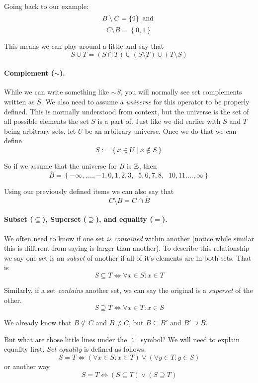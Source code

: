 Going back to our example:
\[
B \setminus C = \left\{9\right\}\textnormal{ and }
\] \[
C \setminus B = \left\{0,1\right\}
\]

This means we can play around a little and say that 
\[
S \cup T = \left(S \cap T\right) \cup \left(S \setminus T\right) \cup  \left(T \setminus S\right) 
\]

\paragraph{Complement ($\sim$).}
While we can write something like $\sim S$, you will normally see set complements written as $\overline{S}$. 
We also need to assume a \emph{universe} for this operator to be properly defined. 
This is normally understood from context, but the universe is the set of all possible elements the set $S$ is a part of. 
Just like we did earlier with $S$ and $T$ being arbitrary sets, let $U$ be an arbitrary universe.
Once we do that we can define 
\[
\overline{S} := \left\{x \in U \mid x \notin S\right\}
\]

So if we assume that the universe for $B$ is $\operatorname{\mathbb{Z}}$,
then 
\[
\overline{B} = \left\{-\infty,....,-1,0,1,2,3,\;\;5,6,7,8,\;\;10,11....,\infty\right\} 
\]

Using our previously defined items we can also say that 
\[
C \setminus B = C \cap \overline{B}
\]

\paragraph{Subset ($\subseteq$), Superset ($\supseteq$), and equality ($=$).}
We often need to know if one set \textit{is contained} within another (notice while similar this is different from saying is larger than another). 
To describe this relationship we say one set is an \emph{subset} of another if all of it's elements are in both sets. 
That is
\[
S \subseteq T \iff \forall x \in S : x \in T
\]

Similarly, if a set \textit{contains} another set, we can say the original is a \emph{superset} of the other. 
\[
S \supseteq T \iff \forall x \in T: x \in S
\] 

We already know that $B \nsubseteq C$ and $B \nsupseteq C$, but $B \subseteq B'$ and $B' \supseteq B$. 

But what are those little lines under the $\subseteq$ symbol? We will need to explain equality first. 
\emph{Set equality} is defined as follows:
\[
S = T \iff \left(\forall x \in S : x \in T\right) \vee \left(\forall y \in T : y \in S\right)
\]
or another way
\[
S = T \iff \left(S \subseteq T\right) \vee \left(S \supseteq T\right)
\]

